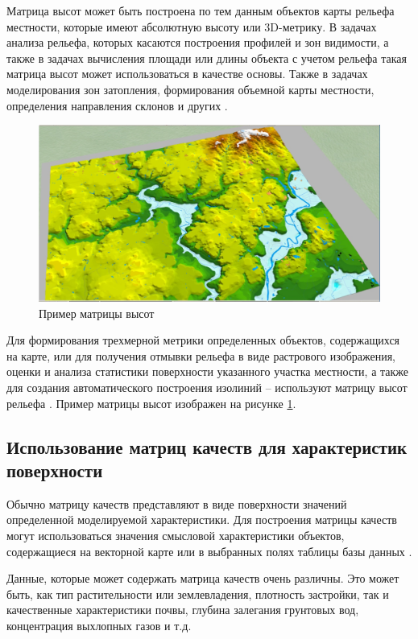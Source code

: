 Матрица высот может быть построена по тем данным объектов карты рельефа местности, которые имеют абсолютную высоту или 3D-метрику. В задачах анализа рельефа, которых касаются построения профилей и зон видимости, а также в задачах вычисления площади или длины объекта с учетом рельефа такая матрица высот может использоваться в качестве основы. Также в задачах моделирования зон затопления, формирования объемной карты местности, определения направления склонов и других \cite{4,12}.

\begin{figure}[h!]
    \center
    \includegraphics[scale=0.3]{images/112.jpg}
    \caption{Пример матрицы высот}
    \label{fig:1}
\end{figure}

Для формирования трехмерной метрики определенных объектов, содержащихся на карте, или для получения отмывки рельефа в виде растрового изображения, оценки и анализа статистики поверхности указанного участка местности, а также для создания автоматического построения изолиний -- используют матрицу высот рельефа \cite{5,14}. Пример матрицы высот изображен на рисунке
\ref{fig:1}.

\subsection{Использование матриц качеств для характеристик поверхности}

Обычно матрицу качеств представляют в виде поверхности значений определенной моделируемой характеристики. Для построения матрицы качеств могут использоваться значения смысловой характеристики объектов, содержащиеся на векторной карте или в выбранных полях таблицы базы данных \cite{6, 7}. 

Данные, которые может содержать матрица качеств очень различны. Это может быть, как тип растительности или землевладения, плотность застройки, так и качественные характеристики почвы, глубина залегания грунтовых вод, концентрация выхлопных газов и т.д.


